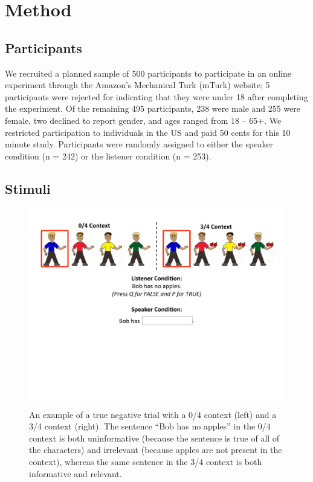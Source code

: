 \documentclass[man, noapacite]{apa2}
\begin{document}
\section{Method}

\subsection{Participants} 

We recruited a planned sample of 500 participants to participate in an online experiment through the Amazon's Mechanical Turk (mTurk) website; 5 participants were rejected for indicating that they were under 18 after completing the experiment.  Of the remaining 495 participants, 238 were male and 255 were female, two declined to report gender, and ages ranged from 18 -- 65+.  We restricted participation to individuals in the US and paid 50 cents for this 10 minute study.  Participants were randomly assigned to either the speaker condition (n = 242) or the listener condition (n = 253).

\subsection{Stimuli}

\begin{figure}[t]
\begin{center} 
\includegraphics[width=6in]{figures/trialfig.pdf}
\caption{\label{fig:trial} An example of a true negative trial with a 0/4 context (left) and a 3/4 context (right).  The sentence ``Bob has no apples'' in the 0/4 context is both uninformative (because the sentence is true of all of the characters) and irrelevant (because apples are not present in the context), whereas the same sentence in the 3/4 context is both informative and relevant. }
\vspace{-5mm}
\end{center} 
\end{figure}
\end{document}
